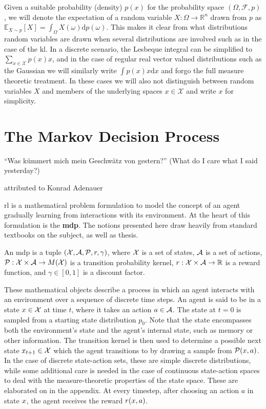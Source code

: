 Given a suitable probability (density) $p(x)$ for the probability space $(\Omega,\mathcal{F},p)$, we will denote the expectation of a random variable $X: \Omega \rightarrow \mathbb{R}^n$ drawn from $p$ as $\mathbb{E}_{X \sim p}\left[X\right] = \int_{\Omega} X(\omega) \mathrm{d} p(\omega)$.
This makes it clear from what distributions random variables are drawn when several distributions are involved such as in the case of the \ac{kl}.
In a discrete scenario, the Lesbeque integral can be simplified to $\sum_{x \in \mathcal{X}} p(x) x$, and in the case of regular real vector valued distributions such as the Gaussian we will similarly write $\int p(x) x \mathrm{d} x$ and forgo the full measure theoretic treatment.
In these cases we will also not distinguish between random variables $X$ and members of the underlying spaces $x \in \mathcal{X}$ and write $x$ for simplicity.


\section{The Markov Decision Process}
\label{chap:background:mdp}
\epigraph{``Was kümmert mich mein Geschwätz von gestern?'' (What do I care what I said yesterday?)}{attributed to Konrad Adenauer}


\ac{rl} is a mathematical problem formulation to model the concept of an agent gradually learning from interactions with its environment.
At the heart of this formulation is the \textbf{\ac{mdp}}.
The notions presented here draw heavily from standard textbooks on the subject, as well as thesis.


\begin{definition}
An {\ac{mdp}} is a tuple $(\mathcal{X},\mathcal{A},\mathcal{P},r,\gamma)$, where $\mathcal{X}$ is a set of states, $\mathcal{A}$ is a set of actions, $\mathcal{P}: \mathcal{X} \times \mathcal{A} \rightarrow M(\mathcal{X})$ is a transition probability kernel, $r: \mathcal{X} \times \mathcal{A} \rightarrow \mathbb{R}$ is a reward function, and $\gamma \in [0,1]$ is a discount factor.
\end{definition}

These mathematical objects describe a process in which an agent interacts with an environment over a sequence of discrete time steps.
An agent is said to be in a state $x \in \mathcal{X}$ at time $t$, where it takes an action $a \in \mathcal{A}$.
The state at $t=0$ is sampled from a starting state distribution $p_0$.
Note that the state encompasses both the environment's state and the agent's internal state, such as memory or other information.
The transition kernel is then used to determine a possible next state $x_{t+1} \in \mathcal{X}$ which the agent transitions to by drawing a sample from $\mathcal{P}(x,a)$.
In the case of discrete state-action sets, these are simple discrete distributions, while some additional care is needed in the case of continuous state-action spaces to deal with the measure-theoretic properties of the state space.
These are elaborated on in the appendix.
At every timestep, after choosing an action $a$ in state $x$, the agent receives the reward $r(x,a)$.


